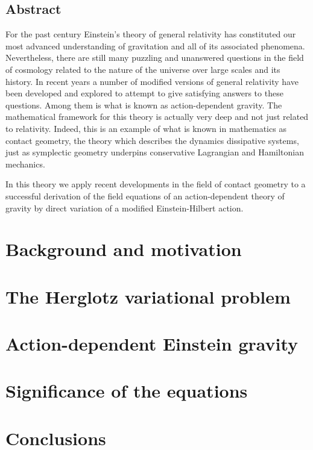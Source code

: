 \documentclass[12pt, oneside]{book}
\begin{document}
\pagebreak
\section*{Abstract}
For the past century Einstein's theory of general relativity has constituted our most
advanced understanding of gravitation and all of its associated phenomena. Nevertheless,
there are still many puzzling and unanswered questions in the field of cosmology related
to the nature of the universe over large scales and its history. In recent years a number
of modified versions of general relativity have been developed and explored to attempt to
give satisfying answers to these questions. Among them is what is known as
action-dependent gravity. The mathematical framework for this theory is actually very deep
and not just related to relativity. Indeed, this is an example of what is known in
mathematics as contact geometry, the theory which describes the dynamics dissipative
systems, just as symplectic geometry underpins conservative Lagrangian and Hamiltonian
mechanics.

In this theory we apply recent developments in the field of contact geometry to a
successful derivation of the field equations of an action-dependent theory of gravity by
direct variation of a modified Einstein-Hilbert action. 

	{\small \sffamily \tableofcontents}

\mainmatter
\pagestyle{main}

\chapter{Background and motivation}


\chapter{The Herglotz variational problem}\label{ch:herglotz}


\chapter{Action-dependent Einstein gravity}\label{ch:einstein}


\chapter{Significance of the equations}\label{ch:significance}


\chapter{Conclusions}\label{ch:conclusions}


\backmatter

\pagestyle{plain}
\printbibliography
\end{document}
